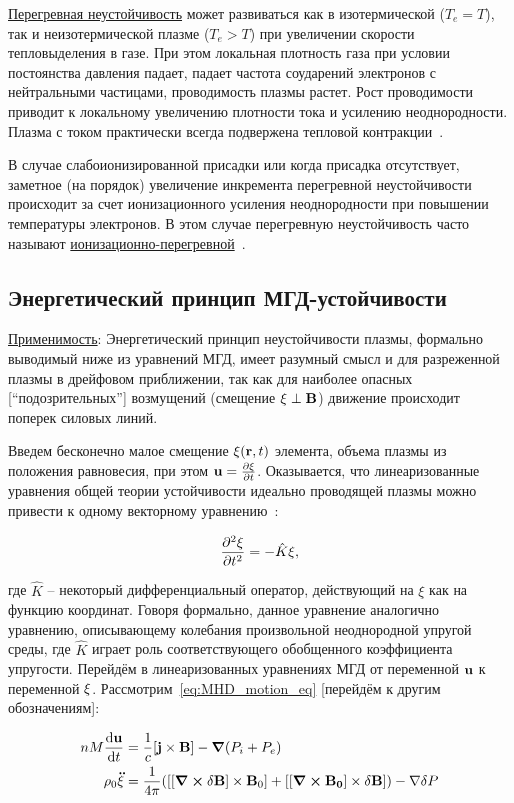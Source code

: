\documentclass[10pt, a4paper]{article}
\begin{document}
\uline{Перегревная неустойчивость} может развиваться как в изотермической ($T_e=T$), так и неизотермической плазме ($T_e>T$) при увеличении скорости тепловыделения в газе. При этом локальная плотность газа при условии постоянства давления падает, падает частота соударений электронов с нейтральными частицами, проводимость плазмы растет. Рост проводимости приводит к локальному увеличению плотности тока и усилению неоднородности. Плазма с током практически всегда подвержена тепловой контракции~\cite{golubev}.

В случае слабоионизированной присадки или когда присадка отсутствует, заметное (на порядок) увеличение инкремента перегревной
неустойчивости происходит за счет ионизационного усиления неоднородности при повышении температуры электронов. В этом случае
перегревную неустойчивость часто называют \uline{ионизационно-перегревной}~\cite{golubev}.
 
\subsection{Энергетический принцип МГД-устойчивости}

\uline{Применимость}: Энергетический принцип неустойчивости плазмы, формально выводимый ниже из уравнений МГД, имеет разумный
смысл и для разреженной плазмы в дрейфовом приближении, так
как для наиболее опасных [``подозрительных''] возмущений (смещение $\vb{\xi}\perp\vb{B}$) движение происходит поперек силовых линий.

Введем бесконечно малое смещение $\vb{\xi}(\vb{r}, t)$ элемента, объема плазмы из положения равновесия, при этом $\vb{u}=\pdv{\vb{\xi}}{t}$. Оказывается, что линеаризованные уравнения общей теории устойчивости идеально проводящей плазмы можно привести к одному векторному уравнению~\cite{arzimovich}:

\begin{equation*}
	\pdv[2]{\vb{\xi}}{t}=-\hat{K}\vb{\xi},
\end{equation*}

где $\hat{K}$ -- некоторый дифференциальный оператор, действующий на $\xi$ как на функцию координат. Говоря формально, данное уравнение аналогично уравнению, описывающему колебания произвольной неоднородной упругой среды, где $\hat{K}$ играет роль соответствующего обобщенного коэффициента упругости. Перейдём в линеаризованных уравнениях МГД от переменной $\vb{u}$ к переменной $\vb{\xi}$. Рассмотрим~\eqref{eq:MHD_motion_eq} [перейдём к другим обозначениям]:

\begin{align*}
	n M \dv{\vb{u}}{t} &= \frac{1}{c}[\vb{j}\times\vb{B}]-\grad{(P_i+P_e)} \\
	\rho_0 \vb{\ddot{\xi}} &= \frac{1}{4\pi}([[\curl{\delta\vb{B}}]\times\vb{B}_0] + [[\curl{\vb{B_0}}]\times\delta\vb{B}])-\nabla \delta P
\end{align*}
\end{document}
